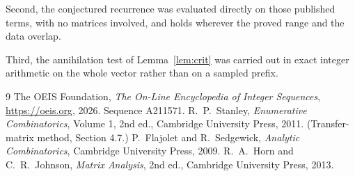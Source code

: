 \documentclass[11pt,a4paper]{article}
\theoremstyle{plain}
\theoremstyle{definition}
\begin{document}
Second, the conjectured recurrence was evaluated directly on those published terms, with no
matrices involved, and holds wherever the proved range and the data overlap.

Third, the annihilation test of Lemma~\ref{lem:crit} was carried out in exact integer
arithmetic on the whole vector rather than on a sampled prefix.

\begin{thebibliography}{9}
 The OEIS Foundation, \emph{The On-Line Encyclopedia of Integer
Sequences}, \url{https://oeis.org}, 2026. Sequence A211571.
 R.~P.~Stanley, \emph{Enumerative Combinatorics}, Volume 1, 2nd ed.,
Cambridge University Press, 2011. (Transfer-matrix method, Section 4.7.)
 P.~Flajolet and R.~Sedgewick, \emph{Analytic Combinatorics}, Cambridge
University Press, 2009.
 R.~A.~Horn and C.~R.~Johnson, \emph{Matrix Analysis}, 2nd ed., Cambridge
University Press, 2013.
\end{thebibliography}
\end{document}
